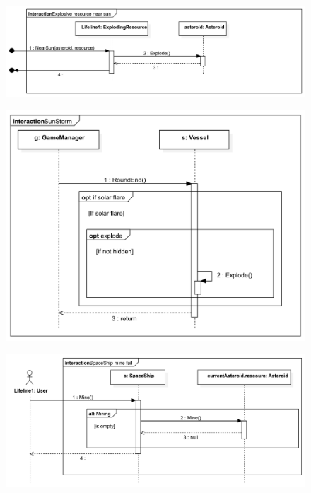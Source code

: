 \documentclass[../../projlab]{subfiles}
\begin{document}
\begin{figure}[H]
	\includegraphics[width=1\textwidth]{docs/2_Project/svg/Design Model!Sun Distance!Resource Explosion!Explosive resource near sun_7.png}
	\centering
\end{figure}

\begin{figure}[H]
	\includegraphics[width=1\textwidth]{docs/2_Project/svg/Design Model!Sun storm!Sun Storm!SunStorm_17.png}
	\centering
\end{figure}

\begin{figure}[H]
	\includegraphics[width=1\textwidth]{docs/2_Project/svg/Design Model!Vessel Actions!SpaceShip mine fail!SpaceShip mine fail_14.png}
	\centering
\end{figure}
\end{document}
